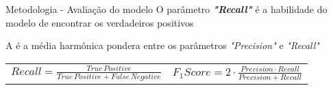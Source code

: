 \begin{frame}[t]{Metodologia - Avaliação do modelo}
    O parâmetro \textbf{\textit{"Recall"}} é a habilidade do modelo de encontrar os verdadeiros positivos
    \vspace{0.4cm}
    
    A  é a média harmônica pondera entre os parâmetros \textit{"Precision"} e \textit{"Recall"}
    \begin{table}[]
        \vspace{0.8cm}
        \centering
        \begin{tabular}{ll}
            \begin{math} Recall = \frac{True\,Positive}{True\,Positive + False\,Negative} \end{math}
            &
            \begin{math} F_1Score = 2\cdot\frac{Precision \cdot Recall}{Precision + Recall} \end{math}
        \end{tabular}
    \end{table}
    
\end{frame}

